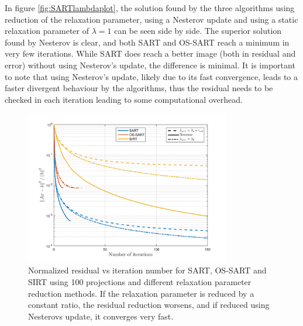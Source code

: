 In figure \ref{fig:SARTlambdaplot}, the solution found by the three algorithms using reduction of the relaxation parameter, using a Nesterov update and using a static relaxation parameter of $\lambda=1$ can be seen side by side. The superior solution found by Nesterov is clear, and both SART and OS-SART reach a minimum in very few iterations. While SART does reach a better image (both in residual and error) without using Nesterov's update, the difference is minimal. It is important to note that using Nesterov's update, likely due to its fast convergence, leads to a faster divergent behaviour by the algorithms, thus the residual needs to be checked in each iteration leading to some computational overhead.

\begin{figure}[H]
\begin{center}

\includegraphics[width=0.8\textwidth]{Applications/SARTlambda.png} 
\end{center}

\caption[Nomralized residual vs iteration of SART/OS-SART/SIRT with different relaxation parameters]{\label{fig:SARTlambda} Normalized residual vs iteration number for SART, OS-SART and SIRT using 100 projections and different relaxation parameter reduction methods. If the relaxation parameter is reduced by a constant ratio, the residual reduction worsens, and if reduced using Nesterovs update, it converges very fast.} 
\end{figure}


